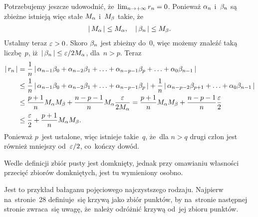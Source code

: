 \documentclass[a4paper,11pt]{article}
\begin{document}
\vspace{\spaceFour}


\start {} Potrzebujemy jeszcze udowodnić,
że~$\lim_{ n \to +\infty } r_{ n } = 0$. Ponieważ $\alpha_{ n }$
i~$\beta_{ n }$ są zbieżne istnieją więc stałe $M_{ \alpha }$ i~$M_{ \beta }$
takie, że
\begin{equation}
  \label{eq:Leja-26}
  \begin{split}
    \left| \,  M_{ \alpha }  \, \right| \leq M_{ \alpha }, \quad \left| \,  \beta_{ n }  \, \right| \leq
    M_{ \beta }.
  \end{split}
\end{equation}
Ustalmy teraz $\varepsilon > 0$. Skoro $\beta_{ n }$ jest zbieżny do~0, więc
możemy znaleźć taką liczbę~$p$,
iż~$\left| \,  \beta_{ n }  \, \right| \leq \varepsilon / 2 M_{ \alpha }$, dla~$n > p$. Teraz
\begin{equation}
  \label{eq:Leja-27}
  \begin{split}
    \left| \,  r_{ n }  \, \right| &= \frac{ 1 }{  n  } \left| \,  \alpha_{ n - 1 } \beta_{ 0 } +
      \alpha_{ n - 2 } \beta_{ 1 } + \ldots + \alpha_{ n - p - 1 } \beta_{ p } +
      \ldots
      + \alpha_{ 0 } \beta_{ n - 1 }  \, \right| \\
    &\leq \frac{ 1 }{  n  } \left| \,  \alpha_{ n - 1 } \beta_{ 0 } + \alpha_{ n - 2 }
      \beta_{ 1 } + \ldots + \alpha_{ n - p - 1 } \beta_{ p }  \, \right| + \frac{ 1 }{  n  }
    \left| \,  \alpha_{ n - p - 2 } \beta_{ p + 1 } + \ldots
      + \alpha_{ 0 } \beta_{ n - 1 }  \, \right| \\
    &\leq \frac{ p + 1 }{ n } M_{ \alpha } M_{ \beta } + \frac{ n - p - 1 }{ n
    } M_{ \alpha } \frac{ \varepsilon }{ 2 M_{ \alpha } } = \frac{ p + 1 }{ n } M_{
      \alpha } M_{ \beta } + \frac{ n - p - 1 }{ n }
    \frac{ \varepsilon }{ 2 } \\
    &\leq \frac{ \varepsilon }{ 2 } + \frac{ p + 1 }{ n } M_{ \alpha } M_{ \beta }.
  \end{split}
\end{equation}
Ponieważ $p$~jest ustalone, więc istnieje takie~$q$, że~dla $n > q$
drugi człon jest również mniejszy od~$\varepsilon / 2$, co~kończy dowód.

\vspace{\spaceFour}


\start {} Wedle definicji zbiór pusty jest domknięty, jednak
przy omawianiu własności przecięć zbiorów domkniętych, jest tu
wymieniony osobno.

\vspace{\spaceFour}


\start {} Jest to przykład bałaganu pojęciowego
najczystszego rodzaju. Najpierw na~stronie~28 definiuje~się krzywą
jako zbiór punktów, by na~stronie następnej stronie zwraca~się uwagę,
że~należy odróżnić krzywą od~jej zbioru punktów.
\end{document}

